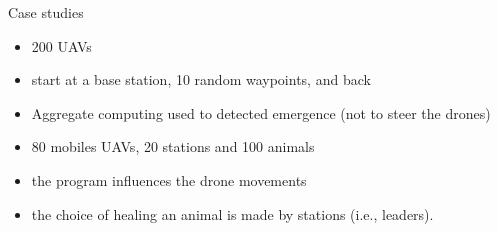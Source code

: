 \documentclass[8pt, aspectratio=169, handout]{beamer}
\begin{document}
\begin{frame}[allowframebreaks]{Case studies}
  \begin{card}
    \begin{multicols}{2}
      \begin{itemize}
        \item 200 UAVs
        \item start at a base station, 10 random waypoints, and back
        \item Aggregate computing used to detected emergence (not to steer the drones)
      \end{itemize}
      \centering
    \end{multicols}
    
    \end{card}
  \begin{card}
    \begin{multicols*}{2}
      \begin{itemize}
        \item 80 mobiles UAVs, 20 stations and 100 animals
        \item the program influences the drone movements 
        \item the choice of healing an animal is made by stations (i.e., leaders).
      \end{itemize}
      \centering
    \end{multicols*}
  \end{card}
\end{frame}
\end{document}
